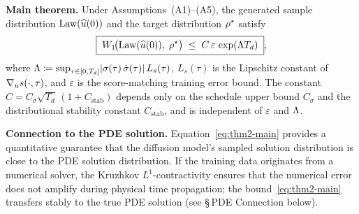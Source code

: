 \begin{theorem}
\medskip
\noindent
\textbf{Main theorem.} Under Assumptions~(A1)--(A5), the generated sample distribution $\mathrm{Law}(\widehat{u}(0))$ and the target distribution $\rho^{\star}$ satisfy
\begin{equation}
\boxed{\;
W_{1}\!\bigl(\mathrm{Law}(\widehat{u}(0)),\; \rho^{\star}\bigr)
\;\le\; C\,\varepsilon\,\exp(\Lambda T_{d})
\;},
\label{eq:thm2-main}
\end{equation}
where $\Lambda \coloneqq \sup_{\tau \in [0, T_{d}]} \lvert \sigma(\tau)\,\dot\sigma(\tau) \rvert\,L_{s}(\tau)$, $L_{s}(\tau)$ is the Lipschitz constant of $\nabla_{u} s(\cdot, \tau)$, and $\varepsilon$ is the score-matching training error bound. The constant $C = C_{\sigma} \sqrt{T_{d}}\,(1 + C_{\mathrm{stab}})$ depends only on the schedule upper bound $C_{\sigma}$ and the distributional stability constant $C_{\mathrm{stab}}$, and is independent of $\varepsilon$ and $\Lambda$.

\medskip
\noindent
\textbf{Connection to the PDE solution.} Equation~\eqref{eq:thm2-main} provides a quantitative guarantee that the diffusion model's sampled solution distribution is close to the PDE solution distribution. If the training data originates from a numerical solver, the Kruzhkov $L^{1}$-contractivity ensures that the numerical error does not amplify during physical time propagation; the bound~\eqref{eq:thm2-main} transfers stably to the true PDE solution (see \S\,PDE Connection below).
\end{theorem}

